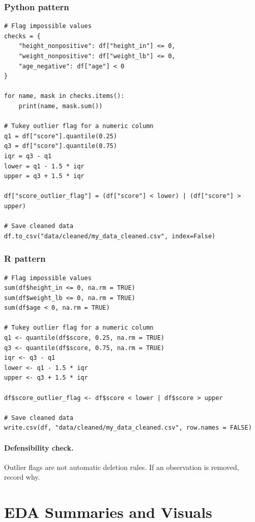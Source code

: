 \subsubsection*{Python pattern}

\begin{verbatim}
# Flag impossible values
checks = {
    "height_nonpositive": df["height_in"] <= 0,
    "weight_nonpositive": df["weight_lb"] <= 0,
    "age_negative": df["age"] < 0
}

for name, mask in checks.items():
    print(name, mask.sum())

# Tukey outlier flag for a numeric column
q1 = df["score"].quantile(0.25)
q3 = df["score"].quantile(0.75)
iqr = q3 - q1
lower = q1 - 1.5 * iqr
upper = q3 + 1.5 * iqr

df["score_outlier_flag"] = (df["score"] < lower) | (df["score"] > upper)

# Save cleaned data
df.to_csv("data/cleaned/my_data_cleaned.csv", index=False)
\end{verbatim}

\subsubsection*{R pattern}

\begin{verbatim}
# Flag impossible values
sum(df$height_in <= 0, na.rm = TRUE)
sum(df$weight_lb <= 0, na.rm = TRUE)
sum(df$age < 0, na.rm = TRUE)

# Tukey outlier flag for a numeric column
q1 <- quantile(df$score, 0.25, na.rm = TRUE)
q3 <- quantile(df$score, 0.75, na.rm = TRUE)
iqr <- q3 - q1
lower <- q1 - 1.5 * iqr
upper <- q3 + 1.5 * iqr

df$score_outlier_flag <- df$score < lower | df$score > upper

# Save cleaned data
write.csv(df, "data/cleaned/my_data_cleaned.csv", row.names = FALSE)
\end{verbatim}

\paragraph{Defensibility check.} Outlier flags are not automatic deletion rules.  If an observation is removed, record why.

\section{EDA Summaries and Visuals}
\label{app:cookbook-eda-data-quality}

